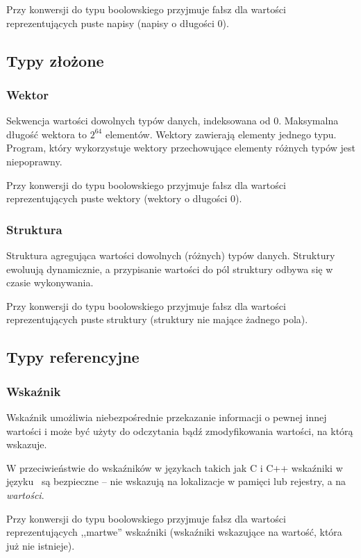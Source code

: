 Przy konwersji do typu boolowskiego przyjmuje fałsz dla wartości
reprezentujących puste napisy (napisy o długości 0).

\subsection{Typy złożone}

\subsubsection{Wektor}

Sekwencja wartości dowolnych typów danych, indeksowana od 0. Maksymalna długość
wektora to $2^{64}$ elementów. Wektory zawierają elementy jednego typu.
Program, który wykorzystuje wektory przechowujące elementy różnych typów jest
niepoprawny.

Przy konwersji do typu boolowskiego przyjmuje fałsz dla wartości
reprezentujących puste wektory (wektory o długości 0).

\subsubsection{Struktura}
\label{viuact_spec_datatypes_aggregate_struct}

Struktura agregująca wartości dowolnych (różnych) typów danych. Struktury
ewoluują dynamicznie, a przypisanie wartości do pól struktury odbywa się w
czasie wykonywania.

Przy konwersji do typu boolowskiego przyjmuje fałsz dla wartości
reprezentujących puste struktury (struktury nie mające żadnego pola).

\subsection{Typy referencyjne}

\subsubsection{Wskaźnik}

Wskaźnik umożliwia niebezpośrednie przekazanie informacji o pewnej innej
wartości i może być użyty do odczytania bądź zmodyfikowania wartości, na którą
wskazuje.

W przeciwieństwie do wskaźników w językach takich jak C i C++ wskaźniki w języku
\ViuAct\ są bezpieczne -- nie wskazują na lokalizacje w pamięci lub rejestry, a
na \emph{wartości}.

Przy konwersji do typu boolowskiego przyjmuje fałsz dla wartości
reprezentujących ,,martwe'' wskaźniki (wskaźniki wskazujące na wartość, która
już nie istnieje).

